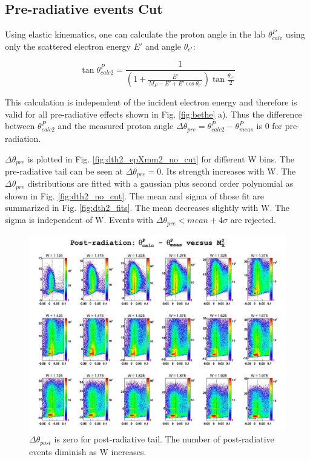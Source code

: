 \subsection{Pre-radiative events Cut}
Using elastic kinematics, one can calculate the proton angle in the lab $\theta^P_{calc}$
using only the scattered electron energy $E'$ and angle $\theta_{e'}$:

$$
\tan\theta^P_{calc2} =  \frac{1}{(1+\frac{E'}{M_P-E'+E'\cos\theta_{e'}})\tan\frac{\theta_{e'}}{2}}
$$

This calculation is independent of the incident electron energy and therefore is valid for
all pre-radiative effects shown in Fig. \ref{fig:bethe} a).
Thus the difference between $\theta^P_{calc2}$ and the measured proton angle
$\Delta\theta_{pre} = \theta^P_{calc2} - \theta^P_{meas}$ is 0 for pre-radiation.


$\Delta\theta_{pre}$ is plotted in Fig. \ref{fig:dth2_epXmm2_no_cut}
for different W bins. The pre-radiative tail can be seen at $\Delta\theta_{pre}=0$.
Its strength increases with W.
The $\Delta\theta_{pre}$ distributions are fitted with a gaussian plus second order polynomial
as shown in Fig. \ref{fig:dth2_no_cut}. The mean and sigma of those fit are summarized in Fig. \ref{fig:dth2_fits}.
The mean decreases slightly with W. The sigma is independent of W. Events with
$\Delta\theta_{pre} < mean + 4\sigma$ are rejected.	
	

\begin{landscape}
	\begin{figure}[ht]
	\centering
		\includegraphics[width=1.15\textheight]{img/dth1_epXmm2_no_cut.jpg}
		\caption{$\Delta\theta_{post}$ is zero for post-radiative tail. The number of post-radiative
		        events diminish as W increases.}
		\label{fig:dth1_epXmm2_no_cut}
	\end{figure}
\end{landscape}
\clearpage\newpage

